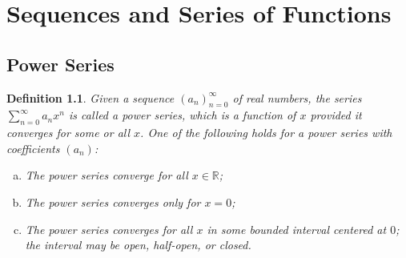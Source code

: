 \documentclass[12pt, lettersize]{book}
\newtheorem{dfn}[thm]{Definition}
\newcommand{\R}{\mathbb{R}}
\begin{document}
	\chapter{Sequences and Series of Functions}
	\newpage
	\section{Power Series}
	\begin{dfn}
		Given a sequence $(a_n)_{n=0}^{\infty}$ of real numbers, the series $\sum_{n=0}^{\infty}a_nx^n$ is called 
		a power series, which is a function of $x$ provided it converges for some or all $x$. One of the following
		holds for a power series with coefficients $(a_n)$:
		\begin{enumerate}[(a)]
			\item The power series converge for all $x\in\R$;
			\item The power series converges only for $x=0$;
			\item The power series converges for all $x$ in some bounded interval centered at $0$; the interval may be
			open, half-open, or closed.
		\end{enumerate}
	\end{dfn}
	
\end{document}
